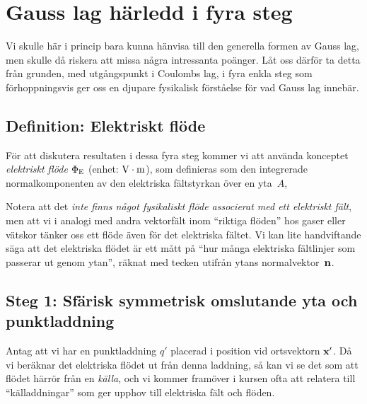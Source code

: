 \section{Gauss lag h{\"a}rledd i fyra steg}
Vi skulle h{\"a}r i princip bara kunna h{\"a}nvisa till den generella formen av Gauss lag, men skulle d{\aa} riskera att missa n{\aa}gra intressanta po{\"a}nger. L{\aa}t oss d{\"a}rf{\"o}r ta detta fr{\aa}n grunden, med ut\-g{\aa}ngs\-punkt i Coulombs lag, i fyra enkla steg som f{\"o}rhoppningsvis ger oss en djupare fysikalisk f{\"o}rst{\aa}else f{\"o}r vad Gauss lag inneb{\"a}r.

\subsection{Definition: Elektriskt fl{\"o}de}
F{\"o}r att diskutera resultaten i dessa fyra steg kommer vi att anv{\"a}nda konceptet {\it elektriskt fl{\"o}de} $\Phi_{\rm E}$ (enhet: ${\rm V}\cdot{\rm m}$), som definieras som den integrerade normalkomponenten av den elektriska f{\"a}ltstyrkan {\"o}ver en yta~$A$,
\bigskip\centerline{}
\medskip
\noindent
Notera att det {\it inte finns n{\aa}got fysikaliskt fl{\"o}de associerat med ett elektriskt f{\"a}lt}, men att vi i analogi med andra vektorf{\"a}lt inom ``riktiga fl{\"o}den'' hos gaser eller v{\"a}tskor t{\"a}nker oss ett fl{\"o}de {\"a}ven f{\"o}r det elektriska f{\"a}ltet.
Vi kan lite handviftande s{\"a}ga att det elektriska fl{\"o}det {\"a}r ett m{\aa}tt p{\aa} ``hur m{\aa}nga elektriska f{\"a}ltlinjer som passerar ut genom ytan'', r{\"a}knat med tecken utifr{\aa}n ytans normalvektor~${\bf n}$.
\vfill\eject

\subsection{Steg 1: Sf{\"a}risk symmetrisk omslutande yta och punktladdning}
Antag att vi har en punktladdning $q'$ placerad i position vid ortsvektorn ${\bf x}'$. D{\aa} vi ber{\"a}knar det elektriska fl{\"o}det ut fr{\aa}n denna laddning, s{\aa} kan vi se det som att fl{\"o}det h{\"a}rr{\"o}r fr{\aa}n en {\it k{\"a}lla}, och vi kommer fram{\"o}ver i kursen ofta att relatera till ``k{\"a}lladdningar'' som ger upphov till elektriska f{\"a}lt och fl{\"o}den.

